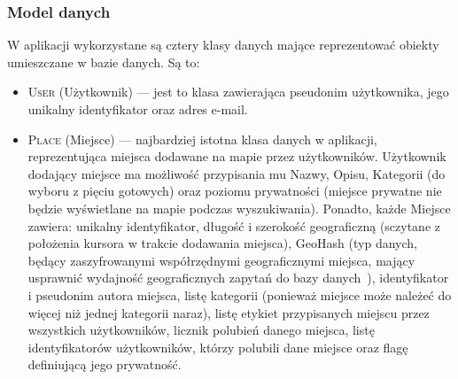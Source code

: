 		\subsubsection{Model danych}
		W aplikacji wykorzystane są cztery klasy danych mające reprezentować obiekty umieszczane w bazie danych. 
		Są to: 

         \begin{itemize}
         	\item  \textsc{User} (Użytkownik) — jest to klasa zawierająca pseudonim użytkownika, jego unikalny identyfikator oraz adres e-mail. 
		
		\item \textsc{Place} (Miejsce) — najbardziej istotna klasa danych w aplikacji, reprezentująca miejsca dodawane na mapie przez użytkowników. Użytkownik dodający miejsce ma możliwość przypisania mu 
		Nazwy, Opisu, Kategorii (do wyboru z pięciu gotowych) oraz poziomu prywatności (miejsce prywatne nie będzie wyświetlane na mapie podczas wyszukiwania). Ponadto, każde Miejsce zawiera:
		unikalny identyfikator, długość i szerokość geograficzną (sczytane z położenia kursora w trakcie dodawania miejsca), GeoHash (typ danych, będący zaszyfrowanymi współrzędnymi geograficznymi miejsca, 
		mający usprawnić wydajność geograficznych zapytań do bazy danych~\cite{GEOHASH}), identyfikator i pseudonim autora miejsca, listę kategorii (ponieważ miejsce może należeć do więcej niż jednej 
		kategorii naraz), listę etykiet przypisanych miejscu przez wszystkich użytkowników, licznik polubień danego miejsca, listę identyfikatorów użytkowników, którzy polubili dane miejsce oraz flagę 
		definiującą jego prywatność. 
		

\end{itemize}
